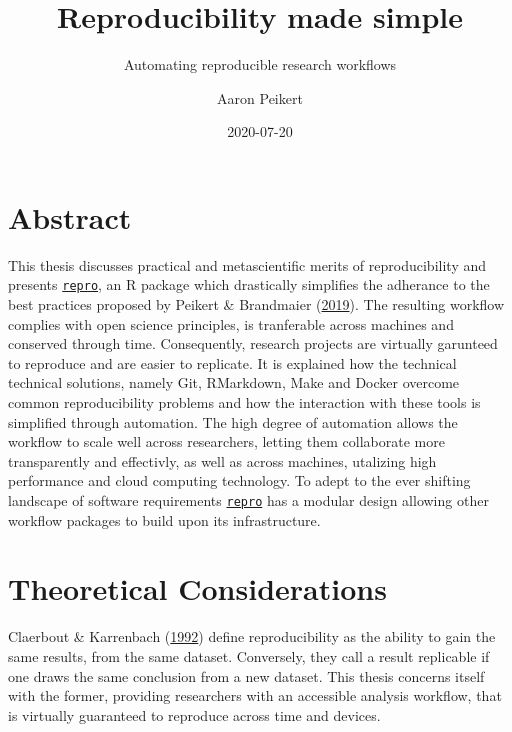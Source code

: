 \documentclass[12pt,a4paper,]{article}
\title{Reproducibility made simple}
\subtitle{Automating reproducible research workflows}
\author{Aaron Peikert}
\date{2020-07-20}
\begin{document}
\maketitle

{
\setcounter{tocdepth}{2}
\tableofcontents
}
\hypertarget{abstract}{%
\section*{Abstract}\label{abstract}}

This thesis discusses practical and metascientific merits of reproducibility and presents \href{https://github.com/aaronpeikert/repro}{\texttt{repro}}, an R package which drastically simplifies the adherance to the best practices proposed by Peikert \& Brandmaier (\protect\hyperlink{ref-peikertReproducibleDataAnalysis2019}{2019}).
The resulting workflow complies with open science principles, is tranferable across machines and conserved through time.
Consequently, research projects are virtually garunteed to reproduce and are easier to replicate.
It is explained how the technical technical solutions, namely Git, RMarkdown, Make and Docker overcome common reproducibility problems and how the interaction with these tools is simplified through automation.
The high degree of automation allows the workflow to scale well across researchers, letting them collaborate more transparently and effectivly, as well as across machines, utalizing high performance and cloud computing technology.
To adept to the ever shifting landscape of software requirements \href{https://github.com/aaronpeikert/repro}{\texttt{repro}} has a modular design allowing other workflow packages to build upon its infrastructure.

\hypertarget{theoretical-considerations}{%
\section{Theoretical Considerations}\label{theoretical-considerations}}

Claerbout \& Karrenbach (\protect\hyperlink{ref-claerboutElectronicDocumentsGive1992}{1992}) define reproducibility as the ability to gain the same results, from the same dataset.
Conversely, they call a result replicable if one draws the same conclusion from a new dataset.
This thesis concerns itself with the former, providing researchers with an accessible analysis workflow, that is virtually guaranteed to reproduce across time and devices.
\end{document}
